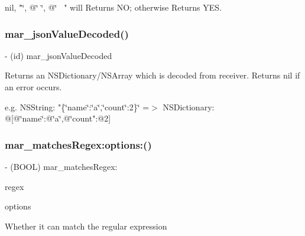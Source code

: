 nil, "\char`\"{}, @\char`\"{} \char`\"{}, @\char`\"{}~\newline
" will Returns NO; otherwise Returns Y\+ES. \mbox{\label{category_n_s_string_07_m_a_r_e_x_08_a352ca5c130970ce27546f804e3a70065}} 
\subsubsection{\texorpdfstring{mar\+\_\+json\+Value\+Decoded()}{mar\_jsonValueDecoded()}}
{\footnotesize\ttfamily -\/ (id) mar\+\_\+json\+Value\+Decoded \begin{DoxyParamCaption}{ }\end{DoxyParamCaption}}

Returns an N\+S\+Dictionary/\+N\+S\+Array which is decoded from receiver. Returns nil if an error occurs.

e.\+g. N\+S\+String\+: "\{\char`\"{}name\char`\"{}\+:\char`\"{}a\char`\"{},\char`\"{}count\char`\"{}\+:2\}\char`\"{}  =$>$ N\+S\+Dictionary\+: @\mbox{[}@\char`\"{}name\char`\"{}\+:@\char`\"{}a\char`\"{},@\char`\"{}count"\+:@2\mbox{]} \mbox{\label{category_n_s_string_07_m_a_r_e_x_08_a212e448cbc097a7670dc710af003ca7e}} 
\subsubsection{\texorpdfstring{mar\+\_\+matches\+Regex\+:options\+:()}{mar\_matchesRegex:options:()}}
{\footnotesize\ttfamily -\/ (B\+O\+OL) mar\+\_\+matches\+Regex\+: \begin{DoxyParamCaption}\item[{(N\+S\+String $\ast$)}]{regex }\item[{options:(N\+S\+Regular\+Expression\+Options)}]{options }\end{DoxyParamCaption}}

Whether it can match the regular expression


